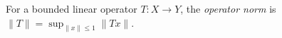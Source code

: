 
For a bounded linear operator $T:X\to Y$, the \emph{operator norm} is $\|T\|=\sup_{\|x\|\le1}\|Tx\|$.
